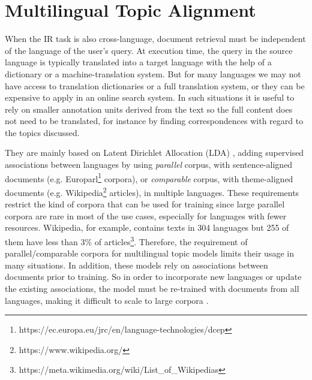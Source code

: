 \section{Multilingual Topic Alignment}


When the IR task is also cross-language, document retrieval must be independent of the language of the user's query. At execution time, the query in the source language is typically translated into a target language with the help of a dictionary or a machine-translation system. But for many languages we may not have access to translation dictionaries or a full translation system, or they can be expensive to apply in an online search system. In such situations it is useful to rely on smaller annotation units derived from the text so the full content does not need to be translated, for instance by finding correspondences with regard to the topics discussed.

They are mainly based on Latent Dirichlet Allocation (LDA) \cite{Blei2003}, adding supervised associations between languages by using \textit{parallel} corpus, with sentence-aligned documents (e.g. Europarl\footnote{https://ec.europa.eu/jrc/en/language-technologies/dcep} corpora), or \textit{comparable} corpus, with theme-aligned documents (e.g. Wikipedia\footnote{https://www.wikipedia.org/} articles), in multiple languages. These requirements restrict the kind of corpora that can be used for training since large parallel corpora are rare in most of the use cases, especially for languages with fewer resources. Wikipedia, for example, contains texts in 304 languages but 255 of them have less than 3\% of articles\footnote{https://meta.wikimedia.org/wiki/List\_of\_Wikipedias}. Therefore, the requirement of parallel/comparable corpora for multilingual topic models limits their usage in many situations. In addition, these models rely on associations between documents prior to training. So in order to incorporate new languages or update the existing associations, the model must be re-trained with documents from all languages, making it difficult to scale to large corpora \cite{Hao2018} \cite{Moritz2017}. 


